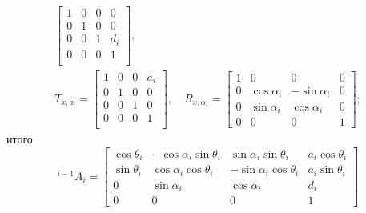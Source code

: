 \begin{enumerate}
\begin{gather}
        \begin{bmatrix}
            1 & 0 & 0 & 0\\
            0 & 1 & 0 & 0\\
            0 & 0 & 1 & d_i\\
            0 & 0 & 0 & 1\\
        \end{bmatrix}\!\!,\\
        T_{x, a_i} =
        \begin{bmatrix}
            1 & 0 & 0 & a_i\\
            0 & 1 & 0 & 0\\
            0 & 0 & 1 & 0\\
            0 & 0 & 0 & 1\\
        \end{bmatrix}\!\!,
        \quad
        R_{x, \alpha_i} =
        \begin{bmatrix}
            1 & 0 & 0 & 0\\
            0 & \cos\alpha_i & -\sin\alpha_i & 0\\
            0 & \sin\alpha_i &  \cos\alpha_i & 0\\
            0 & 0 & 0 & 1
        \end{bmatrix}\!\!;
    \end{gather}
    итого
    \begin{equation}
        {}^{i-1}A_i =
        \begin{bmatrix}
            \cos\theta_i & - \cos\alpha_i \sin\theta_i & \sin\alpha_i \sin\theta_i & a_{i} \cos\theta_i\\
            \sin\theta_i & \cos\alpha_i \cos\theta_i & - \sin\alpha_i \cos\theta_i & a_{i} \sin\theta_i\\
            0 & \sin\alpha_i & \cos\alpha_i & d_{i}\\
            0 & 0 & 0 & 1
        \end{bmatrix}
    \end{equation}
\end{enumerate}

